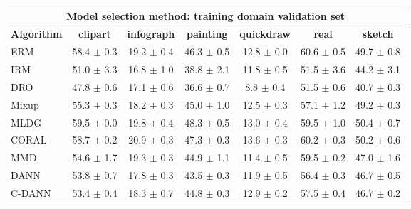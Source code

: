 \documentclass{article}
\begin{document}
\begin{center}
\begin{tabular}{lcccccc}
\toprule
\multicolumn{7}{c}{\textbf{Model selection method: training domain validation set}} \\
\midrule
\textbf{Algorithm}    & \textbf{clipart} & \textbf{infograph} & \textbf{painting} & \textbf{quickdraw} & \textbf{real} & \textbf{sketch}     \\
\midrule
ERM          &    58.4 $\pm$ 0.3 &  19.2 $\pm$ 0.4 &  46.3 $\pm$ 0.5 & 12.8 $\pm$ 0.0 & 60.6 $\pm$ 0.5 & 49.7 $\pm$ 0.8 \\            
IRM          &    51.0 $\pm$ 3.3 &  16.8 $\pm$ 1.0 &  38.8 $\pm$ 2.1 & 11.8 $\pm$ 0.5 & 51.5 $\pm$ 3.6 & 44.2 $\pm$ 3.1 \\            
DRO    &    47.8 $\pm$ 0.6 &  17.1 $\pm$ 0.6 &  36.6 $\pm$ 0.7 & 8.8 $\pm$ 0.4  & 51.5 $\pm$ 0.6 & 40.7 $\pm$ 0.3 \\            
Mixup        &    55.3 $\pm$ 0.3 &  18.2 $\pm$ 0.3 &  45.0 $\pm$ 1.0 & 12.5 $\pm$ 0.3 & 57.1 $\pm$ 1.2 & 49.2 $\pm$ 0.3 \\            
MLDG         &    59.5 $\pm$ 0.0 &  19.8 $\pm$ 0.4 &  48.3 $\pm$ 0.5 & 13.0 $\pm$ 0.4 & 59.5 $\pm$ 1.0 & 50.4 $\pm$ 0.7 \\            
CORAL        &    58.7 $\pm$ 0.2 &  20.9 $\pm$ 0.3 &  47.3 $\pm$ 0.3 & 13.6 $\pm$ 0.3 & 60.2 $\pm$ 0.3 & 50.2 $\pm$ 0.6 \\            
MMD          &    54.6 $\pm$ 1.7 &  19.3 $\pm$ 0.3 &  44.9 $\pm$ 1.1 & 11.4 $\pm$ 0.5 & 59.5 $\pm$ 0.2 & 47.0 $\pm$ 1.6 \\            
DANN          &    53.8 $\pm$ 0.7 &  17.8 $\pm$ 0.3 &  43.5 $\pm$ 0.3 & 11.9 $\pm$ 0.5 & 56.4 $\pm$ 0.3 & 46.7 $\pm$ 0.5 \\            
C-DANN      &    53.4 $\pm$ 0.4 &  18.3 $\pm$ 0.7 &  44.8 $\pm$ 0.3 & 12.9 $\pm$ 0.2 & 57.5 $\pm$ 0.4 & 46.7 $\pm$ 0.2 \\            
\bottomrule
\end{tabular}
\end{center}
\end{document}
